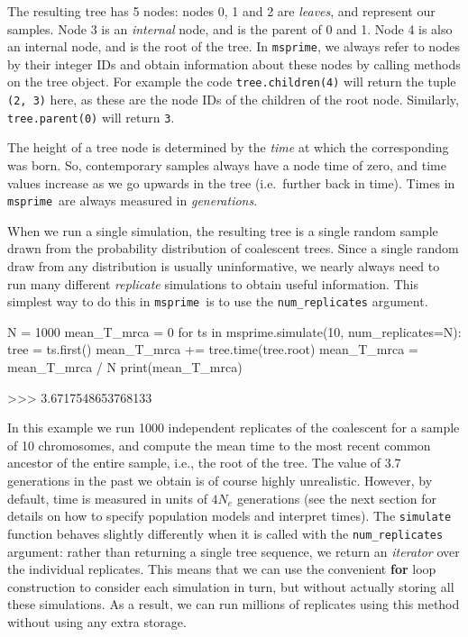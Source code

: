 \documentclass[graybox]{svmult}
\newcommand{\msprime}[0]{\texttt{msprime}}
\begin{document}
The resulting tree has 5 nodes: nodes 0, 1 and 2 are \emph{leaves}, and
represent our samples. Node 3 is an \emph{internal} node, and is the
parent of 0 and 1. Node 4 is also an internal node, and is the root of
the tree. In \msprime, we always refer to nodes by their integer IDs and
obtain information about these nodes by calling methods on the tree
object. For example the code \texttt{tree.children(4)} will return the
tuple \texttt{(2,\ 3)} here, as these are the node IDs of the children
of the root node. Similarly, \texttt{tree.parent(0)} will return
\texttt{3}.

The height of a tree node is determined by the \emph{time} at which the corresponding was born. So,
contemporary samples always have a node time of zero, and time values
increase as we go upwards in the tree (i.e.\ further back in time). Times
in \msprime\ are always measured in \emph{generations}.

When we run a single simulation, the resulting tree is a single random
sample drawn from the probability distribution of coalescent trees. Since a
single random draw from any distribution is usually uninformative, we
nearly always need to run many different \emph{replicate} simulations to
obtain useful information. This simplest way to do this in \msprime\ is to
use the \texttt{num\_replicates} argument.

\begin{pythoncode}
N = 1000
mean_T_mrca = 0
for ts in msprime.simulate(10, num_replicates=N):
    tree = ts.first()
    mean_T_mrca += tree.time(tree.root)
mean_T_mrca = mean_T_mrca / N
print(mean_T_mrca)

>>> 3.6717548653768133
\end{pythoncode}

    In this example we run 1000 independent replicates of the coalescent for
a sample of 10 chromosomes, and compute the mean time to the most recent
common ancestor of the entire sample, i.e., the root of the
tree. The value of 3.7 generations in the past we obtain is of course highly unrealistic. However, by default, time is measured in units of \(4 N_e\) generations (see the next section for details on how to
specify population models and interpret times). The
\texttt{simulate} function behaves slightly differently when it is
called with the \texttt{num\_replicates} argument: rather than returning
a single tree sequence, we return an \emph{iterator} over the individual
replicates. This means that we can use the
convenient \textbf{for} loop construction to consider each simulation in
turn, but without actually storing all these simulations. As a result,
we can run millions of replicates using this method without
using any extra storage.
\end{document}
